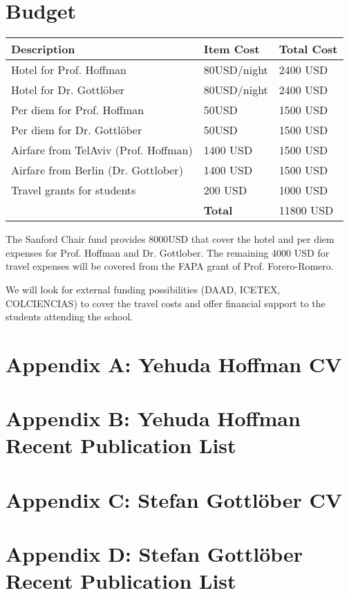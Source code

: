 \documentclass[12pt]{article}
\begin{document}
\section{Budget}



\begin{tabular}{lll}\hline
Description & Item Cost & Total Cost \\\hline
Hotel for Prof. Hoffman & 80USD/night & 2400 USD\\
Hotel for Dr. Gottl\"ober & 80USD/night & 2400 USD\\
Per diem for Prof. Hoffman & 50USD  & 1500 USD\\
Per diem for Dr. Gottl\"ober & 50USD & 1500 USD \\
Airfare from TelAviv (Prof. Hoffman) & 1400 USD & 1500 USD\\
Airfare from Berlin (Dr. Gottlober) & 1400 USD & 1500 USD\\
Travel grants for students & 200 USD & 1000 USD\\\hline
 & {\bf Total} & 11800 USD\\\hline
\end{tabular}

\vspace{1cm}

The Sanford Chair fund provides 8000USD that cover the hotel and
per diem expenses for Prof. Hoffman and Dr. Gottlober. The remaining
4000 USD for travel expenses will be covered from the FAPA grant of
Prof. Forero-Romero. 

We will look for external funding possibilities (DAAD, ICETEX,
COLCIENCIAS) to cover the travel costs and offer financial support to
the students attending the school. 

\newpage
\section*{Appendix A: Yehuda Hoffman CV} 

\newpage
\section*{Appendix B: Yehuda Hoffman Recent Publication List} 

\newpage
\section*{Appendix C: Stefan Gottl\"ober CV} 

\newpage
\section*{Appendix D: Stefan Gottl\"ober Recent Publication List} 
\end{document}

